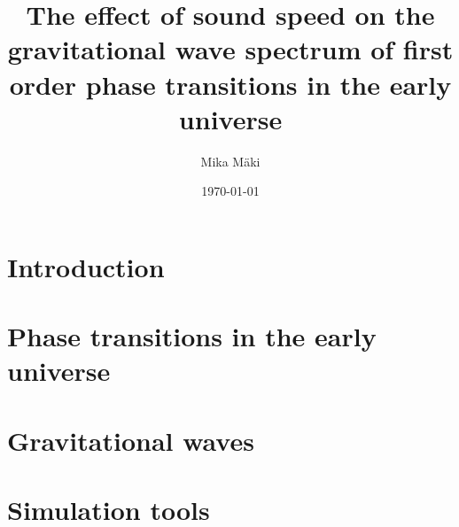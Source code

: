 \documentclass[english,twoside,openright]{UH_TCM_MSc}
\title{The effect of sound speed on the gravitational wave spectrum of first order phase transitions in the early universe}
\author{Mika Mäki}
\date{\today}
\begin{document}
\maketitle


\begin{abstract}

\end{abstract}

\mytableofcontents

\mynomenclature

\clearpage
\listoffigures
\clearpage
\listoftables
\clearpage

\listoftodos
\clearpage

% 

\chapter{Introduction}
\label{ch:introduction}


\chapter{Phase transitions in the early universe}
\label{ch:pt}







% 



\chapter{Gravitational waves}
\label{ch:gw}


\chapter{Simulation tools}
\label{ch:simulation}

\end{document}
